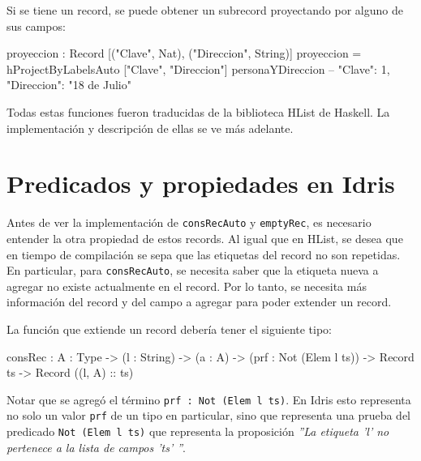 
Si se tiene un record, se puede obtener un subrecord proyectando por alguno de sus campos:

\begin{code}
proyeccion : Record [("Clave", Nat), ("Direccion", String)]
proyeccion = hProjectByLabelsAuto ["Clave", "Direccion"]
  personaYDireccion
-- { "Clave": 1, "Direccion": "18 de Julio" }
\end{code}

Todas estas funciones fueron traducidas de la biblioteca HList de Haskell. La implementación y descripción de ellas se ve más adelante.

\section{Predicados y propiedades en Idris}

Antes de ver la implementación de \texttt{consRecAuto} y \texttt{emptyRec}, es necesario entender la otra propiedad de estos records. Al igual que en HList, se desea que en tiempo de compilación se sepa que las etiquetas del record no son repetidas. En particular, para \texttt{consRecAuto}, se necesita saber que la etiqueta nueva a agregar no existe actualmente en el record. Por lo tanto, se necesita más información del record y del campo a agregar para poder extender un record.

La función que extiende un record debería tener el siguiente tipo:

\begin{code}
consRec : {A : Type} -> (l : String) -> (a : A) ->
  (prf : Not (Elem l ts)) -> Record ts -> 
  Record ((l, A) :: ts)
\end{code}

Notar que se agregó el término \texttt{prf : Not (Elem l ts)}. En Idris esto representa no solo un valor \texttt{prf} de un tipo en particular, sino que representa una prueba del predicado \texttt{Not (Elem l ts)} que representa la proposición \textit{''La etiqueta 'l' no pertenece a la lista de campos 'ts' ''}.

